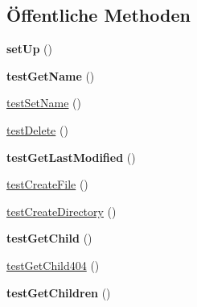 \subsection*{Öffentliche Methoden}
\begin{DoxyCompactItemize}
\item 
\mbox{\label{class_sabre_1_1_card_d_a_v_1_1_address_book_home_test_a3debc54402f8fb4756463f17b2cec322}} 
{\bfseries set\+Up} ()
\item 
\mbox{\label{class_sabre_1_1_card_d_a_v_1_1_address_book_home_test_a4ff620c4aac95ade12a54aee92f7504f}} 
{\bfseries test\+Get\+Name} ()
\item 
\mbox{\hyperlink{class_sabre_1_1_card_d_a_v_1_1_address_book_home_test_aaca906e3648aa481f0408bfef3cf84e7}{test\+Set\+Name}} ()
\item 
\mbox{\hyperlink{class_sabre_1_1_card_d_a_v_1_1_address_book_home_test_a29a8ba1683bb43e4b36836459dd0fa8f}{test\+Delete}} ()
\item 
\mbox{\label{class_sabre_1_1_card_d_a_v_1_1_address_book_home_test_adad0ec6f68110cc631ec4d1527d93a6a}} 
{\bfseries test\+Get\+Last\+Modified} ()
\item 
\mbox{\hyperlink{class_sabre_1_1_card_d_a_v_1_1_address_book_home_test_aa59fd157c4e47cf62bdf56eb07049c1a}{test\+Create\+File}} ()
\item 
\mbox{\hyperlink{class_sabre_1_1_card_d_a_v_1_1_address_book_home_test_aa07e3663567e23e214f42a08387d0abc}{test\+Create\+Directory}} ()
\item 
\mbox{\label{class_sabre_1_1_card_d_a_v_1_1_address_book_home_test_ab2617ee503949e25d3aa72654e550e19}} 
{\bfseries test\+Get\+Child} ()
\item 
\mbox{\hyperlink{class_sabre_1_1_card_d_a_v_1_1_address_book_home_test_af2034337d38d873822705a31ea5989e4}{test\+Get\+Child404}} ()
\item 
\mbox{\label{class_sabre_1_1_card_d_a_v_1_1_address_book_home_test_ac27296a1dd313860bb1de25e42d14c41}} 
{\bfseries test\+Get\+Children} ()
\item 

\end{DoxyCompactItemize}
